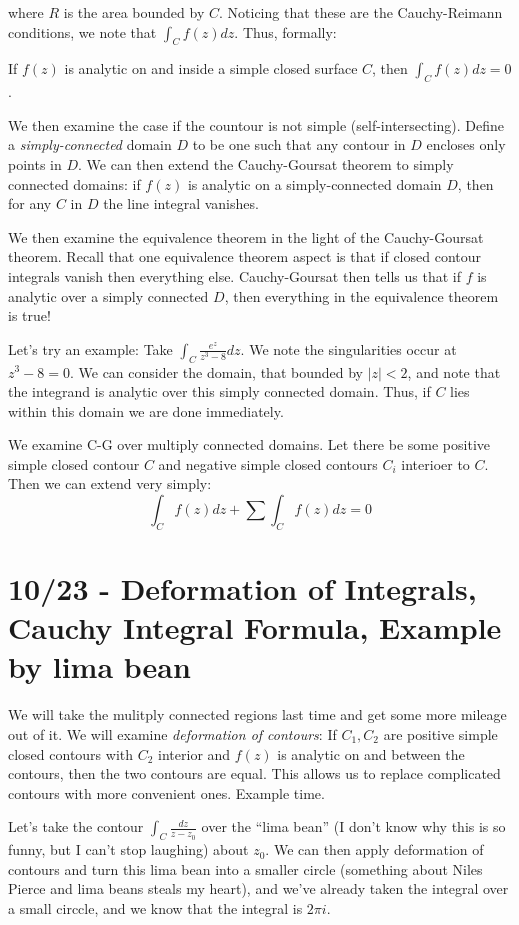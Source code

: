 \documentclass[10pt]{report}
\begin{document}
where $R$ is the area bounded by $C$. Noticing that these are the Cauchy-Reimann conditions, we note that $\int_C f(z) dz$. Thus, formally:
\begin{center}
	If $f(z)$ is analytic on and inside a simple closed surface $C$, then $\int_C f(z) dz = 0$.
\end{center}

We then examine the case if the countour is not simple (self-intersecting). Define a \emph{simply-connected} domain $D$ to be one such that any contour in $D$ encloses only points in $D$. We can then extend the Cauchy-Goursat theorem to simply connected domains: if $f(z)$ is analytic on a simply-connected domain $D$, then for any $C$ in $D$ the line integral vanishes.

We then examine the equivalence theorem in the light of the Cauchy-Goursat theorem. Recall that one equivalence theorem aspect is that if closed contour integrals vanish then everything else. Cauchy-Goursat then tells us that if $f$ is analytic over a simply connected $D$, then everything in the equivalence theorem is true!

Let's try an example: Take $\int_C \frac{e^z}{z^3-8}dz$. We note the singularities occur at $z^3-8=0$. We can consider the domain, that bounded by $|z| < 2$, and note that the integrand is analytic over this simply connected domain. Thus, if $C$ lies within this domain we are done immediately. 

We examine C-G over multiply connected domains. Let there be some positive simple closed contour $C$ and negative simple closed contours $C_i$ interioer to $C$. Then we can extend very simply:
$$\int_C f(z) dz + \sum \int_C f(z) dz = 0$$

\chapter{10/23 - Deformation of Integrals, Cauchy Integral Formula, Example by lima bean}

We will take the mulitply connected regions last time and get some more mileage out of it. We will examine \emph{deformation of contours}: If $C_1,C_2$ are positive simple closed contours with $C_2$ interior and $f(z)$ is analytic on and between the contours, then the two contours are equal. This allows us to replace complicated contours with more convenient ones. Example time. 

Let's take the contour $\int_C \frac{dz}{z-z_0}$ over the ``lima bean'' (I don't know why this is so funny, but I can't stop laughing) about $z_0$. We can then apply deformation of contours and turn this lima bean into a smaller circle (something about Niles Pierce and lima beans steals my heart), and we've already taken the integral over a small circcle, and we know that the integral is $2\pi i$. 
\end{document}
